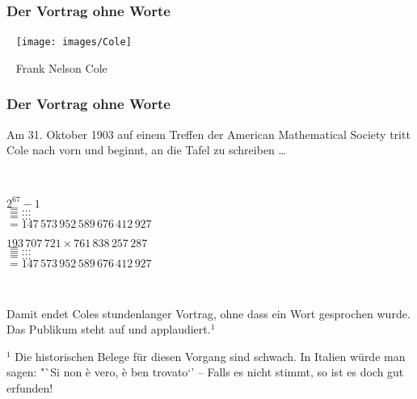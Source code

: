 \documentclass[aspectratio=1610,onlymath]{beamer}
\begin{document}
\begin{frame}\frametitle{Der Vortrag ohne Worte}

~\hfill
\texttt{[image: images/Cole]}
\hfill~

~\hfill
Frank Nelson Cole
\hfill~



\end{frame}

\begin{frame}\frametitle{Der Vortrag ohne Worte}

Am 31. Oktober 1903 auf einem Treffen der American Mathematical Society tritt Cole nach vorn und beginnt,
an die Tafel zu schreiben \ldots \bigskip\pause

~\hfill
\begin{minipage}{6.5cm}
$2^{67}-1$\\\pause
$= \ldots$\\\pause
$= \ldots$\\\pause
$= \ldots$\\\pause
$= 147\,573\,952\,589\,676\,412\,927$\pause
\end{minipage}
\begin{minipage}{6.5cm}
$193\,707\,721 \times 761\,838\,257\,287$\\\pause
$= \ldots$\\\pause
$= \ldots$\\\pause
$= \ldots$\\\pause
$= 147\,573\,952\,589\,676\,412\,927$\pause
\end{minipage}
\hfill~
\bigskip

Damit endet Coles stundenlanger Vortrag, ohne dass ein Wort gesprochen wurde.\\
Das Publikum steht auf und applaudiert.$^1$\medskip

{\tiny $^1$ Die historischen Belege für diesen Vorgang sind schwach. In Italien würde man sagen: "`Si non è vero, è ben trovato`' -- Falls es nicht stimmt, so ist es doch gut erfunden!

}

\end{frame}
\end{document}
